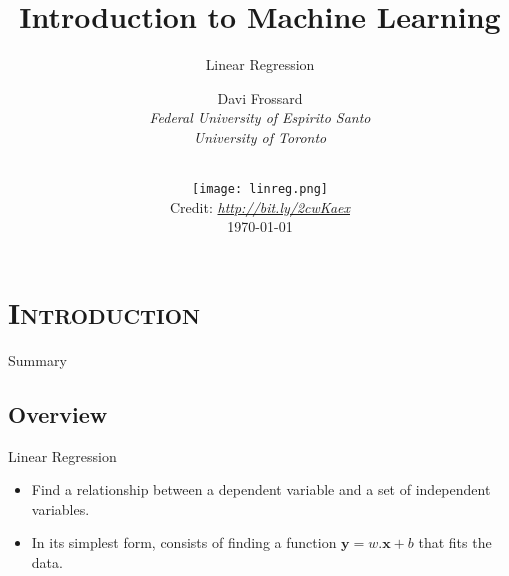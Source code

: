 





\section{\scshape Introduction}
\begin{frame}
\title{Introduction to Machine Learning}
\subtitle{Linear Regression}
\author{
	Davi Frossard\\
	{\it Federal University of Espirito Santo \\ University of Toronto}\\
}
\date{
    \vspace{-2em}\\
    \texttt{[image: linreg.png]}\\[-1ex]
    {\tiny Credit: {\itshape \url{http://bit.ly/2cwKaex}}}
    \\
	\today
}
\titlepage
\end{frame}

\begin{frame}{Summary}
\tableofcontents
\end{frame}

\subsection{Overview}
\begin{frame}{Linear Regression}
	\begin{itemize}
		\item Find a relationship between a dependent variable and a set of independent variables.
		\item In its simplest form, consists of finding a function $\boldsymbol{y} = w.\boldsymbol{x} + b$ that fits the data.
		\begin{center}
		\end{center}
	\end{itemize}
\end{frame}


